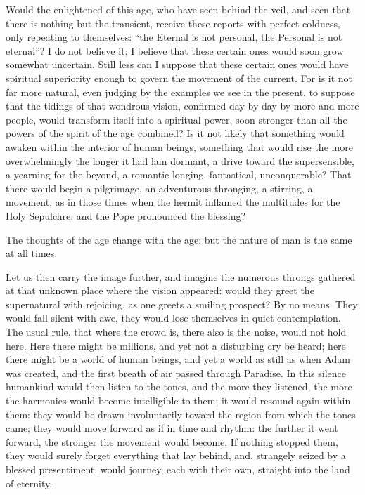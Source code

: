 \documentclass[12pt,a4paper]{book}
\begin{document}
Would the enlightened of this age, who have seen behind the veil, and seen that there is nothing but the transient, receive these reports with perfect coldness, only repeating to themselves: ``the Eternal is not personal, the Personal is not eternal''? I do not believe it; I believe that these certain ones would soon grow somewhat uncertain. Still less can I suppose that these certain ones would have spiritual superiority enough to govern the movement of the current. For is it not far more natural, even judging by the examples we see in the present, to suppose that the tidings of that wondrous vision, confirmed day by day by more and more people, would transform itself into a spiritual power, soon stronger than all the powers of the spirit of the age combined? Is it not likely that something would awaken within the interior of human beings, something that would rise the more overwhelmingly the longer it had lain dormant, a drive toward the supersensible, a yearning for the beyond, a romantic longing, fantastical, unconquerable? That there would begin a pilgrimage, an adventurous thronging, a stirring, a movement, as in those times when the hermit inflamed the multitudes for the Holy Sepulchre, and the Pope pronounced the blessing?

The thoughts of the age change with the age; but the nature of man is the same at all times.

Let us then carry the image further, and imagine the numerous throngs gathered at that unknown place where the vision appeared: would they greet the supernatural with rejoicing, as one greets a smiling prospect? By no means. They would fall silent with awe, they would lose themselves in quiet contemplation. The usual rule, that where the crowd is, there also is the noise, would not hold here. Here there might be millions, and yet not a disturbing cry be heard; here there might be a world of human beings, and yet a world as still as when Adam was created, and the first breath of air passed through Paradise.
In this silence humankind would then listen to the tones, and the more they listened, the more the harmonies would become intelligible to them; it would resound again within them: they would be drawn involuntarily toward the region from which the tones came; they would move forward as if in time and rhythm: the further it went forward, the stronger the movement would become. If nothing stopped them, they would surely forget everything that lay behind, and, strangely seized by a blessed presentiment, would journey, each with their own, straight into the land of eternity.
\end{document}
